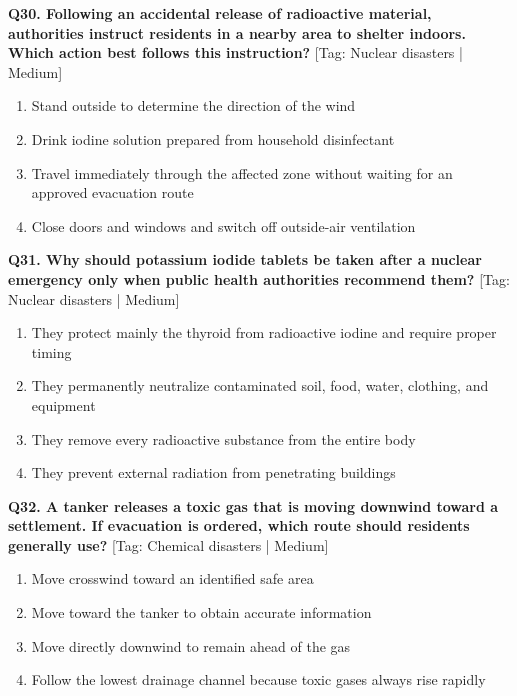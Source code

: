 \noindent\textbf{Q30. Following an accidental release of radioactive material, authorities instruct residents in a nearby area to shelter indoors. Which action best follows this instruction?} \hfill [Tag: Nuclear disasters | Medium]
\begin{enumerate}[label=(\alph*),topsep=2pt,itemsep=1pt,partopsep=0pt,parsep=0pt]
    \item {Stand outside to determine the direction of the wind}
    \item {Drink iodine solution prepared from household disinfectant}
    \item {Travel immediately through the affected zone without waiting for an approved evacuation route}
    \item {Close doors and windows and switch off outside-air ventilation}
\end{enumerate}
\vspace{2mm}

\noindent\textbf{Q31. Why should potassium iodide tablets be taken after a nuclear emergency only when public health authorities recommend them?} \hfill [Tag: Nuclear disasters | Medium]
\begin{enumerate}[label=(\alph*),topsep=2pt,itemsep=1pt,partopsep=0pt,parsep=0pt]
    \item {They protect mainly the thyroid from radioactive iodine and require proper timing}
    \item {They permanently neutralize contaminated soil, food, water, clothing, and equipment}
    \item {They remove every radioactive substance from the entire body}
    \item {They prevent external radiation from penetrating buildings}
\end{enumerate}
\vspace{2mm}

\noindent\textbf{Q32. A tanker releases a toxic gas that is moving downwind toward a settlement. If evacuation is ordered, which route should residents generally use?} \hfill [Tag: Chemical disasters | Medium]
\begin{enumerate}[label=(\alph*),topsep=2pt,itemsep=1pt,partopsep=0pt,parsep=0pt]
    \item {Move crosswind toward an identified safe area}
    \item {Move toward the tanker to obtain accurate information}
    \item {Move directly downwind to remain ahead of the gas}
    \item {Follow the lowest drainage channel because toxic gases always rise rapidly}
\end{enumerate}
\vspace{2mm}


